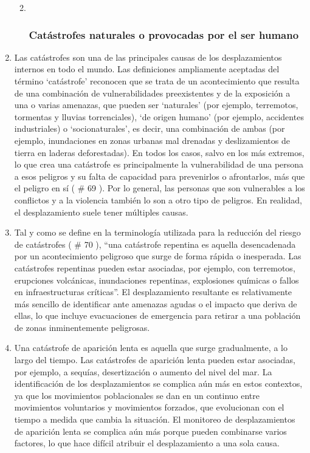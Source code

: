 \documentclass[
]{book}
\begin{document}
\begin{enumerate}
  \begin{enumerate}
  \def\labelenumii{\arabic{enumii}.}
  \item ~
    \hypertarget{catuxe1strofes-naturales-o-provocadas-por-el-ser-humano}{%
    \subsubsection{Catástrofes naturales o provocadas por el ser humano}\label{catuxe1strofes-naturales-o-provocadas-por-el-ser-humano}}
  \end{enumerate}
\item
  Las catástrofes son una de las principales causas de los desplazamientos internos en todo el mundo. Las definiciones ampliamente aceptadas del término `catástrofe' reconocen que se trata de un acontecimiento que resulta de una combinación de vulnerabilidades preexistentes y de la exposición a una o varias amenazas, que pueden ser `naturales' (por ejemplo, terremotos, tormentas y lluvias torrenciales), `de origen humano' (por ejemplo, accidentes industriales) o `socionaturales', es decir, una combinación de ambas (por ejemplo, inundaciones en zonas urbanas mal drenadas y deslizamientos de tierra en laderas deforestadas). En todos los casos, salvo en los más extremos, lo que crea una catástrofe es principalmente la vulnerabilidad de una persona a esos peligros y su falta de capacidad para prevenirlos o afrontarlos, más que el peligro en sí (
  \# 69
  ). Por lo general, las personas que son vulnerables a los conflictos y a la violencia también lo son a otro tipo de peligros. En realidad, el desplazamiento suele tener múltiples causas.
\item
  Tal y como se define en la terminología utilizada para la reducción del riesgo de catástrofes (
  \# 70
  ), ``una catástrofe repentina es aquella desencadenada por un acontecimiento peligroso que surge de forma rápida o inesperada. Las catástrofes repentinas pueden estar asociadas, por ejemplo, con terremotos, erupciones volcánicas, inundaciones repentinas, explosiones químicas o fallos en infraestructuras críticas''. El desplazamiento resultante es relativamente más sencillo de identificar ante amenazas agudas o el impacto que deriva de ellas, lo que incluye evacuaciones de emergencia para retirar a una población de zonas inminentemente peligrosas.
\item
  Una catástrofe de aparición lenta es aquella que surge gradualmente, a lo largo del tiempo. Las catástrofes de aparición lenta pueden estar asociadas, por ejemplo, a sequías, desertización o aumento del nivel del mar. La identificación de los desplazamientos se complica aún más en estos contextos, ya que los movimientos poblacionales se dan en un continuo entre movimientos voluntarios y movimientos forzados, que evolucionan con el tiempo a medida que cambia la situación. El monitoreo de desplazamientos de aparición lenta se complica aún más porque pueden combinarse varios factores, lo que hace difícil atribuir el desplazamiento a una sola causa.


\end{enumerate}
\end{document}
